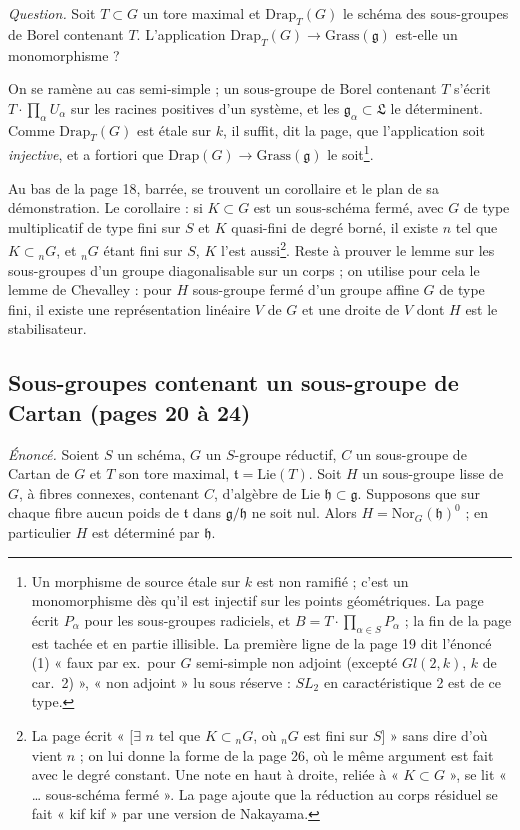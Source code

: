 \documentclass[11pt,a4paper]{article}
\begin{document}
\emph{Question.} Soit $T \subset G$ un tore maximal et $\mathrm{Drap}_T(G)$ le
schéma des sous-groupes de Borel contenant $T$. L'application
$\mathrm{Drap}_T(G) \to \mathrm{Grass}(\mathfrak{g})$ est-elle un monomorphisme ?

On se ramène au cas semi-simple ; un sous-groupe de Borel contenant $T$ s'écrit
$T \cdot \prod_{\alpha} U_\alpha$ sur les racines positives d'un système, et les
$\mathfrak{g}_\alpha \subset \mathfrak{L}$ le déterminent. Comme
$\mathrm{Drap}_T(G)$ est étale sur $k$, il suffit, dit la page, que l'application
soit \emph{injective}, et a fortiori que $\mathrm{Drap}(G) \to
\mathrm{Grass}(\mathfrak{g})$ le soit\footnote{Un morphisme de source étale sur
$k$ est non ramifié ; c'est un monomorphisme dès qu'il est injectif sur les
points géométriques. La page écrit $P_\alpha$ pour les sous-groupes radiciels, et
$B = T \cdot \prod_{\alpha \in S} P_\alpha$ ; la fin de la page est tachée et en
partie illisible. La première ligne de la page 19 dit l'énoncé (1) « faux par
ex.\ pour $G$ semi-simple non adjoint (excepté $Gl(2,k)$, $k$ de car.\ 2) »,
« non adjoint » lu sous réserve : $SL_2$ en caractéristique 2 est de ce type.}.

Au bas de la page 18, barrée, se trouvent un corollaire et le plan de sa
démonstration. Le corollaire : si $K \subset G$ est un sous-schéma fermé, avec
$G$ de type multiplicatif de type fini sur $S$ et $K$ quasi-fini de degré borné,
il existe $n$ tel que $K \subset {}_nG$, et ${}_nG$ étant fini sur $S$, $K$ l'est
aussi\footnote{La page écrit « [$\exists$ $n$ tel que $K \subset {}_nG$, où ${}_nG$
est fini sur $S$] » sans dire d'où vient $n$ ; on lui donne la forme de la
page 26, où le même argument est fait avec le degré constant. Une note en haut à
droite, reliée à « $K \subset G$ », se lit « … sous-schéma fermé ». La page
ajoute que la réduction au corps résiduel se fait « kif kif » par une version de
Nakayama.}. Reste à prouver le lemme sur les sous-groupes d'un groupe
diagonalisable sur un corps ; on utilise pour cela le lemme de Chevalley : pour
$H$ sous-groupe fermé d'un groupe affine $G$ de type fini, il existe une
représentation linéaire $V$ de $G$ et une droite de $V$ dont $H$ est le
stabilisateur.

\subsection*{Sous-groupes contenant un sous-groupe de Cartan (pages 20 à 24)}

\emph{Énoncé.} Soient $S$ un schéma, $G$ un $S$-groupe réductif, $C$ un
sous-groupe de Cartan de $G$ et $T$ son tore maximal, $\mathfrak{t} =
\mathrm{Lie}(T)$. Soit $H$ un sous-groupe lisse de $G$, à fibres connexes,
contenant $C$, d'algèbre de Lie $\mathfrak{h} \subset \mathfrak{g}$. Supposons que
sur chaque fibre aucun poids de $\mathfrak{t}$ dans $\mathfrak{g}/\mathfrak{h}$ ne
soit nul. Alors $H = \mathrm{Nor}_G(\mathfrak{h})^0$ ; en particulier $H$ est
déterminé par $\mathfrak{h}$.
\end{document}
